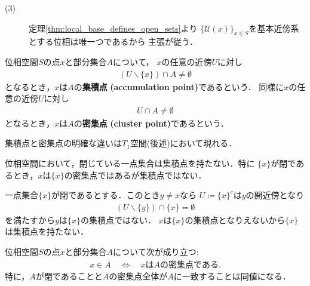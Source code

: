 \begin{prf}
\begin{description}
			\item[(3)] 
				定理\ref{thm:local_base_defines_open_sets}より
				$\{\mathscr{U}(x)\}_{x \in S}$を基本近傍系とする位相は唯一つであるから
				主張が従う．
				\QED
		\end{description}
	\end{prf}
	
	\begin{screen}
		\begin{dfn}
			位相空間$S$の点$x$と部分集合$A$について，
			$x$の任意の近傍$U$に対し
			\begin{align}
				(U \backslash \{x\}) \cap A \neq \emptyset
			\end{align}
			となるとき，$x$は$A$の{\bf 集積点}
			{\bf (accumulation point)}であるという．
			同様に$x$の任意の近傍$U$に対し
			\begin{align}
				U \cap A \neq \emptyset
			\end{align}
			となるとき，$x$は$A$の{\bf 密集点}
			{\bf (cluster point)}であるという．
		\end{dfn}
	\end{screen}
	
	集積点と密集点の明確な違いは$T_1$空間(後述)において現れる．
	\begin{screen}
		\begin{thm}[閉である一点集合は集積点を持たない]
		\label{thm:closed_singleton_has_no_accumulation_point}
			位相空間において，閉じている一点集合は集積点を持たない．特に
			$\{x\}$が閉であるとき，$x$は$\{x\}$の密集点ではあるが集積点ではない．
		\end{thm}
	\end{screen}
	
	\begin{prf}
		一点集合$\{x\}$が閉であるとする．このとき$y \neq x$なら
		$U \coloneqq \{x\}^c$は$y$の開近傍となり
		\begin{align}
			(U \backslash \{y\}) \cap \{x\} = \emptyset
		\end{align}
		を満たすから$y$は$\{x\}$の集積点ではない．
		$x$は$\{x\}$の集積点となりえないから$\{x\}$は集積点を持たない．
		\QED
	\end{prf}
	
	\begin{screen}
		\begin{thm}[閉集合は密集点集合]
		\label{thm:belongs_to_closure_iff_clusters}
			位相空間$S$の点$x$と部分集合$A$について次が成り立つ:
			\begin{align}
				x \in \overline{A} \quad \Longleftrightarrow \quad
				\mbox{$x$は$A$の密集点である}.
				\label{eq:thm_belongs_to_closure_iff_clusters}
			\end{align}
			特に，$A$が閉であることと$A$の密集点全体が$A$に一致することは同値になる．
		\end{thm}
	\end{screen}
	
